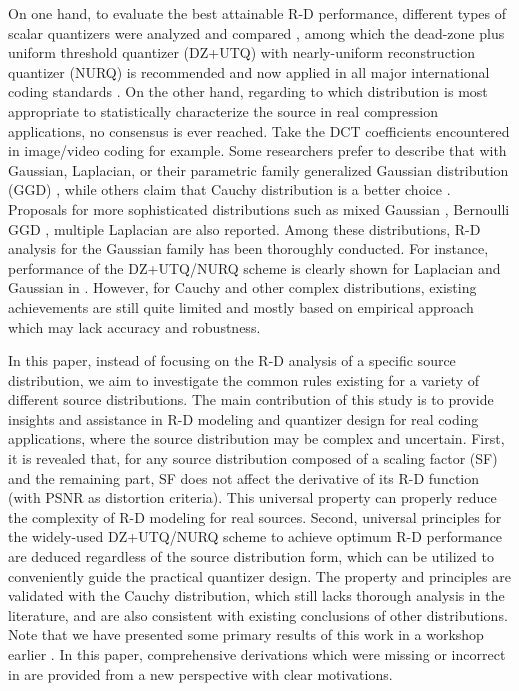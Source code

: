 \documentclass[smallabstract,smallcaptions]{dccpaper}
\begin{document}
On one hand, to evaluate the best attainable R-D performance, different types of scalar quantizers were analyzed and compared \cite{Sullivan_TIT1996}, among which the dead-zone plus uniform threshold quantizer (DZ+UTQ) with nearly-uniform reconstruction quantizer (NURQ) is recommended and now applied in all major international coding standards \cite{Sullivan_VCIP2005}. On the other hand, regarding to which distribution is most appropriate to statistically characterize the source in real compression applications, no consensus is ever reached. Take the DCT coefficients encountered in image/video coding for example. Some researchers prefer to describe that with Gaussian, Laplacian, or their parametric family generalized Gaussian distribution (GGD) \cite{Pratt_Wiley1978,Smooth_SPIE1996,Sun_TCSVT2009}, while others claim that Cauchy distribution is a better choice \cite{Kamaci_TCSVT2005}\cite{Rod_TCSVT2010}. Proposals for more sophisticated distributions such as mixed Gaussian \cite{Eude_ICASSP1994}, Bernoulli GGD \cite{Fraysse_TIT2009}, multiple Laplacian \cite{Lee_TCSVT2014} are also reported. Among these distributions, R-D analysis for the Gaussian family has been thoroughly conducted. For instance, performance of the DZ+UTQ/NURQ scheme is clearly shown for Laplacian and Gaussian in \cite{Sullivan_VCIP2005}. However, for Cauchy and other complex distributions, existing achievements are still quite limited and mostly based on empirical approach which may lack accuracy and robustness.

In this paper, instead of focusing on the R-D analysis of a specific source distribution, we aim to investigate the common rules existing for a variety of different source distributions. The main contribution of this study is to provide insights and assistance in R-D modeling and quantizer design for real coding applications, where the source distribution may be complex and uncertain. First, it is revealed that, for any source distribution composed of a scaling factor (SF) and the remaining part, SF does not affect the derivative of its R-D function (with PSNR as distortion criteria). This universal property can properly reduce the complexity of R-D modeling for real sources. Second, universal principles for the widely-used DZ+UTQ/NURQ scheme to achieve optimum R-D performance are deduced regardless of the source distribution form, which can be utilized to conveniently guide the practical quantizer design. The property and principles are validated with the Cauchy distribution, which still lacks thorough analysis in the literature, and are also consistent with existing conclusions of other distributions. Note that we have presented some primary results of this work in a workshop earlier \cite{Sun_MMSP2015}. In this paper, comprehensive derivations which were missing or incorrect in \cite{Sun_MMSP2015} are provided from a new perspective with clear motivations.
\end{document}
